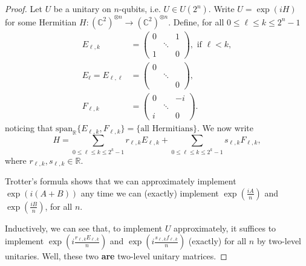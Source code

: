 \documentclass{article}
\begin{document}
    \begin{proof}
        Let $U$ be a unitary on $n$-qubits, i.e. $U \in U \left( 2^n \right)$. Write $U = \exp{(iH)}$ for some Hermitian $H: \left( \mathbb{C} ^2 \right)^{\otimes n} \rightarrow \left( \mathbb{C} ^2 \right)^{\otimes n}$. Define, for all $0 \leq \ell \leq k \leq 2^n - 1$
        \begin{align*}
            E_{\ell, k} & =
            \begin{pmatrix}
                0 && 1 \\
                & \ddots \\
                1 && 0
            \end{pmatrix}, \text{ if } \ell < k, \\
            E_{\ell} = E_{\ell, \ell} & = 
            \begin{pmatrix}
                0 && \\
                & \ddots \\
                && 0
            \end{pmatrix}, \\
            F_{\ell, k} & =
            \begin{pmatrix}
                0 && -i \\
                & \ddots \\
                i && 0
            \end{pmatrix}.
        \end{align*}
        noticing that $\text{span}_\mathbb{R} \{ E_{\ell, k}, F_{\ell, k} \} = \{ \text{all Hermitians} \}$. We now write
        \begin{equation*}
            H = \sum_{0 \leq \ell \leq k \leq 2^k - 1} r_{\ell, k} E_{\ell, k} +  \sum_{0 \leq \ell \leq k \leq 2^k - 1} s_{\ell, k} F_{\ell, k},
        \end{equation*}
        where $r_{\ell, k}, s_{\ell, k} \in \mathbb{R}$.

        Trotter's formula shows that we can approximately implement $\exp{(i (A + B))}$ any time we can (exactly) implement $\exp{\left( \frac{iA}{n} \right)}$ and $\exp{\left( \frac{iB}{n} \right)}$, for all $n$.

        Inductively, we can see that, to implement $U$ approximately, it suffices to implement $\exp{\left( i\frac{r_{\ell, k} E_{\ell, k}}{n} \right)}$ and $\exp{\left( i\frac{s_{\ell, k} f_{\ell, k}}{n} \right)}$ (exactly) for all $n$ by two-level unitaries. Well, these two \textbf{are} two-level unitary matrices.
    \end{proof}
\end{document}
